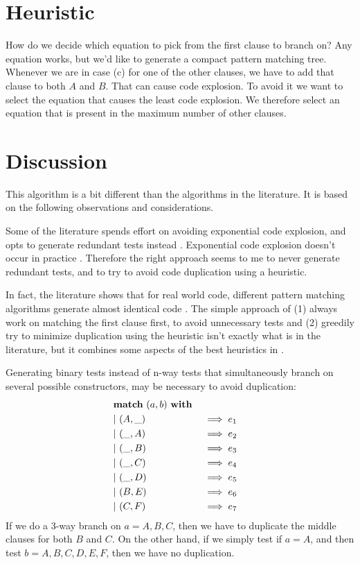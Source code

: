 \documentclass[a4paper, 11pt]{article}
\theoremstyle{definition}
\begin{document}
\section{Heuristic}

How do we decide which equation to pick from the first clause to branch on? Any equation works, but we'd like to generate a compact pattern matching tree. Whenever we are in case (c) for one of the other clauses, we have to add that clause to both $A$ and $B$. That can cause code explosion. To avoid it we want to select the equation that causes the least code explosion. We therefore select an equation that is present in the maximum number of other clauses.

\section{Discussion}

This algorithm is a bit different than the algorithms in the literature. It is based on the following observations and considerations.

Some of the literature spends effort on avoiding exponential code explosion, and opts to generate redundant tests instead \cite{augustsson_compiling_1985}. Exponential code explosion doesn't occur in practice \cite{scott_when_2000}. Therefore the right approach seems to me to never generate redundant tests, and to try to avoid code duplication using a heuristic.

In fact, the literature shows that for real world code, different pattern matching algorithms generate almost identical code \cite{scott_when_2000,maranget_compiling_2008}. The simple approach of (1) always work on matching the first clause first, to avoid unnecessary tests and (2) greedily try to minimize duplication using the heuristic isn't exactly what is in the literature, but it combines some aspects of the best heuristics in \cite{maranget_compiling_2008}.

Generating binary tests instead of n-way tests that simultaneously branch on several possible constructors, may be necessary to avoid duplication:
\begin{alignat*}{4}
  &\mathbf{match}\ (a,b)\ \mathbf{with} \\
  &\mathbf{\mid}\ (A,\_)\quad &&\implies e_1 & \\
  &\mathbf{\mid}\ (\_,A)\quad &&\implies e_2 & \\
  &\mathbf{\mid}\ (\_,B)\quad &&\implies e_3 & \\
  &\mathbf{\mid}\ (\_,C)\quad &&\implies e_4 & \\
  &\mathbf{\mid}\ (\_,D)\quad &&\implies e_5 & \\
  &\mathbf{\mid}\ (B,E)\quad &&\implies e_6 & \\
  &\mathbf{\mid}\ (C,F)\quad &&\implies e_7 &
\end{alignat*}
If we do a 3-way branch on $a=A,B,C$, then we have to duplicate the middle clauses for both $B$ and $C$. On the other hand, if we simply test if $a=A$, and then test $b=A,B,C,D,E,F$, then we have no duplication.
\end{document}

